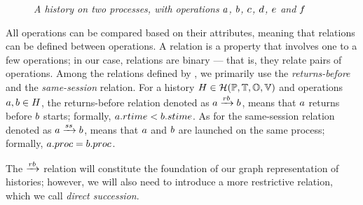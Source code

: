 \documentclass[12pt]{article}
\begin{document}
\begin{figure}
\begin{center}
\end{center}
\caption{\small \slshape A history on two processes, with operations $a$, $b$, $c$, $d$, $e$ and $f$}
\label{fig:fig1}
\end{figure}


All operations can be compared based on their attributes, meaning that relations can be defined between operations. A relation is a property that involves one to a few operations; in our case, relations are binary --- that is, they relate pairs of operations. Among the relations defined by , we primarily use the \textsl{returns-before} and the \textsl{same-session} relation. For a history $H\in\mathcal{H}(\mathbb{P}, \mathbb{T}, \mathbb{O}, \mathbb{V})$ and operations \mbox{$a,b\in H$}, the returns-before relation denoted as $a\xrightarrow{rb}b$, means that $a$ returns before $b$ starts; formally, $a.rtime<b.stime$. As for the same-session relation denoted as $a\xrightarrow{ss}b$, means that $a$ and $b$ are launched on the same process; formally, $a.proc=b.proc$.

The $\xrightarrow{rb}$ relation will constitute the foundation of our graph representation of histories; however, we will also need to introduce a more restrictive relation, which we call \textsl{direct succession}.
\end{document}
